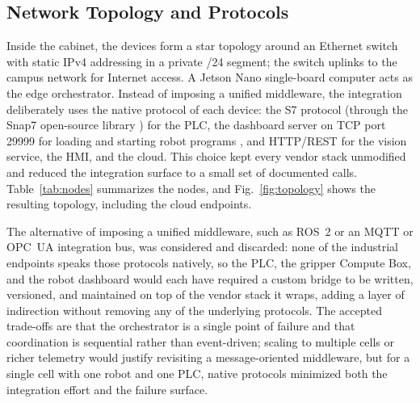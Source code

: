 \documentclass[conference]{IEEEtran}
\begin{document}
\subsection{Network Topology and Protocols}
Inside the cabinet, the devices form a star topology around an Ethernet switch with static IPv4 addressing in a private /24 segment; the switch uplinks to the campus network for Internet access. A Jetson Nano single-board computer acts as the edge orchestrator. Instead of imposing a unified middleware, the integration deliberately uses the native protocol of each device: the S7 protocol (through the Snap7 open-source library \cite{b13}) for the PLC, the dashboard server on TCP port 29999 for loading and starting robot programs \cite{b14}, and HTTP/REST for the vision service, the HMI, and the cloud. This choice kept every vendor stack unmodified and reduced the integration surface to a small set of documented calls. Table~\ref{tab:nodes} summarizes the nodes, and Fig.~\ref{fig:topology} shows the resulting topology, including the cloud endpoints.

The alternative of imposing a unified middleware, such as ROS~2 \cite{b16} or an MQTT or OPC~UA integration bus, was considered and discarded: none of the industrial endpoints speaks those protocols natively, so the PLC, the gripper Compute Box, and the robot dashboard would each have required a custom bridge to be written, versioned, and maintained on top of the vendor stack it wraps, adding a layer of indirection without removing any of the underlying protocols. The accepted trade-offs are that the orchestrator is a single point of failure and that coordination is sequential rather than event-driven; scaling to multiple cells or richer telemetry would justify revisiting a message-oriented middleware, but for a single cell with one robot and one PLC, native protocols minimized both the integration effort and the failure surface.
\end{document}
